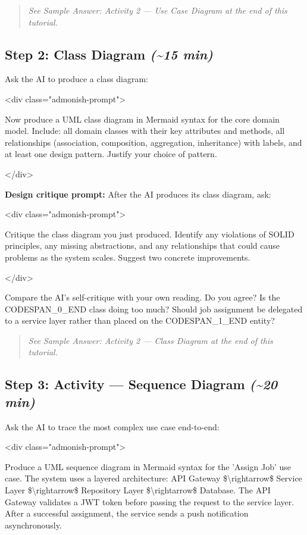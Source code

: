 \documentclass[11pt,a4paper]{book}
\begin{document}
\begin{quote}
\textit{See Sample Answer: Activity 2 --- Use Case Diagram at the end of this tutorial.}
\end{quote}

\subsection{Step 2: Class Diagram \textit{(\textasciitilde{}15 min)}}

Ask the AI to produce a class diagram:

<div class="admonish-prompt">

Now produce a UML class diagram in Mermaid syntax for the core domain model. Include: all domain classes with their key attributes and methods, all relationships (association, composition, aggregation, inheritance) with labels, and at least one design pattern. Justify your choice of pattern.

</div>

\textbf{Design critique prompt:} After the AI produces its class diagram, ask:

<div class="admonish-prompt">

Critique the class diagram you just produced. Identify any violations of SOLID principles, any missing abstractions, and any relationships that could cause problems as the system scales. Suggest two concrete improvements.

</div>

Compare the AI's self-critique with your own reading. Do you agree? Is the CODESPAN\_0\_END class doing too much? Should job assignment be delegated to a service layer rather than placed on the CODESPAN\_1\_END entity?

\begin{quote}
\textit{See Sample Answer: Activity 2 --- Class Diagram at the end of this tutorial.}
\end{quote}

\subsection{Step 3: Activity --- Sequence Diagram \textit{(\textasciitilde{}20 min)}}

Ask the AI to trace the most complex use case end-to-end:

<div class="admonish-prompt">

Produce a UML sequence diagram in Mermaid syntax for the 'Assign Job' use case. The system uses a layered architecture: API Gateway \$\textbackslash{}rightarrow\$ Service Layer \$\textbackslash{}rightarrow\$ Repository Layer \$\textbackslash{}rightarrow\$ Database. The API Gateway validates a JWT token before passing the request to the service layer. After a successful assignment, the service sends a push notification asynchronously.
\end{document}
